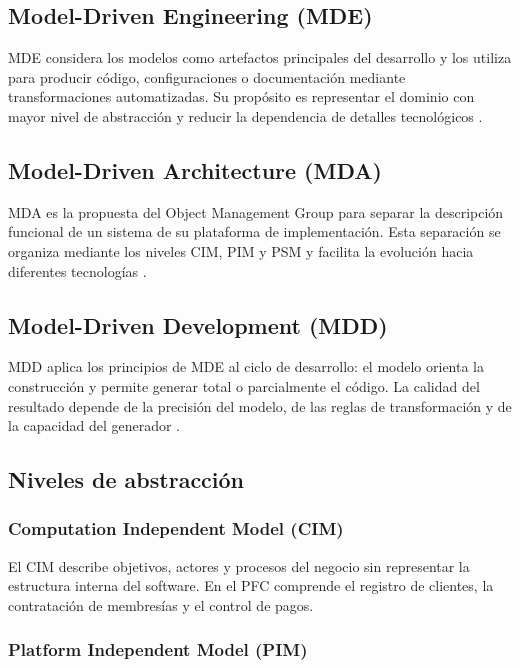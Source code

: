 \documentclass[12pt,a4paper]{article}
\begin{document}
\subsection{Model-Driven Engineering (MDE)}

MDE considera los modelos como artefactos principales del desarrollo y los
utiliza para producir código, configuraciones o documentación mediante
transformaciones automatizadas. Su propósito es representar el dominio con
mayor nivel de abstracción y reducir la dependencia de detalles tecnológicos
\cite{schmidt2006,selic2003}.

\subsection{Model-Driven Architecture (MDA)}

MDA es la propuesta del Object Management Group para separar la descripción
funcional de un sistema de su plataforma de implementación. Esta separación
se organiza mediante los niveles CIM, PIM y PSM y facilita la evolución hacia
diferentes tecnologías \cite{omgMDA2014}.

\subsection{Model-Driven Development (MDD)}

MDD aplica los principios de MDE al ciclo de desarrollo: el modelo orienta la
construcción y permite generar total o parcialmente el código. La calidad del
resultado depende de la precisión del modelo, de las reglas de transformación
y de la capacidad del generador \cite{selic2003}.

\subsection{Niveles de abstracción}

\subsubsection{Computation Independent Model (CIM)}

El CIM describe objetivos, actores y procesos del negocio sin representar la
estructura interna del software. En el PFC comprende el registro de clientes,
la contratación de membresías y el control de pagos.

\subsubsection{Platform Independent Model (PIM)}
\end{document}
